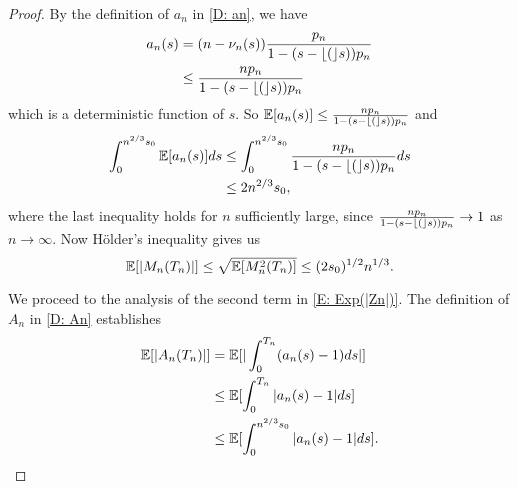 \begin{proof}
    By the definition of $a_n$ in \eqref{D: an}, we have
    \begin{equation}
    \begin{aligned}
    a_n(s) &= (n - \nu_n(s)) \frac{p_n}{1 - (s - \lfloor(\rfloor s))p_n} \\
    &\leq \frac{n p_n}{1 - (s - \lfloor(\rfloor s))p_n}
    \end{aligned}
    \end{equation}
    which is a deterministic function of $s$. So
    $ \mathbb{E}[a_n(s)] \leq \frac{n p_n}{1 - (s - \lfloor(\rfloor s))p_n} $
    and
    \begin{equation}
    \begin{aligned}
    \int_{0}^{n^{2 / 3}s_0} \mathbb{E}[a_n(s)] ds 
    &\leq \int_{0}^{n^{2 / 3}s_0}\frac{n p_n}{1 - (s - \lfloor(\rfloor s))p_n}ds \\
    &\leq 2n^{2 / 3}s_0,
    \end{aligned}
    \end{equation}
    where the last inequality holds for $n$ sufficiently large, since 
    $\frac{n p_n}{1 - (s - \lfloor(\rfloor s))p_n} \rightarrow 1$
    as $n \rightarrow \infty$.
    Now Hölder's inequality gives us
    \begin{equation} \label{E: Exp(Mn)}
    \mathbb{E}[|M_n(T_n)|] \leq \sqrt{\mathbb{E}[M^2_n(T_n)]} \leq (2s_0)^{1/2}n^{1 / 3}.
    \end{equation}
    
    We proceed to the analysis of the second term in \eqref{E: Exp(|Zn|)}.
    The definition of $A_n$ in \eqref{D: An} establishes
    \begin{equation}
    \begin{aligned}
    \mathbb{E}[|A_n(T_n)|] 
    &= \mathbb{E}[|\int_{0}^{T_n}(a_n(s) -1)ds |] \\
    &\leq \mathbb{E}[\int_{0}^{T_n} |a_n(s)-1|ds] \\
    &\leq \mathbb{E}[\int_{0}^{n^{2 / 3}s_0} |a_n(s)-1|ds].
    \end{aligned}
    \end{equation}
    

\end{proof}
